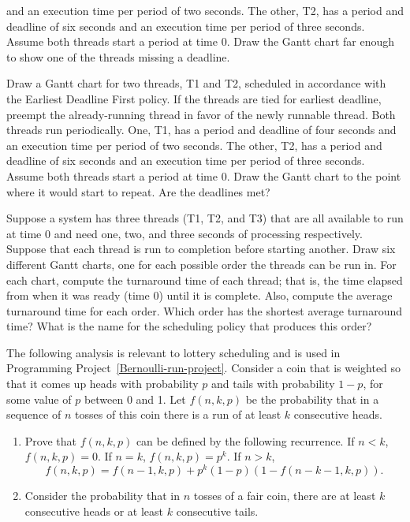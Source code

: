 \begin{chapterEnumerate}
and an execution time per period of two seconds.  The other, T2, has a
period and deadline of six seconds and an execution time per period
of three seconds.  Assume both threads start a period at time 0.  Draw
the Gantt chart far enough to show one of the threads missing a deadline.
\item\label{Gantt-EDF-exercise}
Draw a Gantt chart for two threads, T1 and T2, scheduled in accordance
with the Earliest Deadline First policy.  If the threads are tied for
earliest deadline, preempt the already-running thread in favor of the
newly runnable thread.  Both threads run periodically.  One, T1, has a
period and deadline of four seconds and an execution time per
period of two seconds.  The other, T2, has a period and deadline of
six seconds and an execution time per period of three seconds.
Assume both threads start a period at time 0.  Draw the Gantt chart
to the point where it would start to repeat.  Are the deadlines met?
\item\label{Gantt-SJF-exercise}
Suppose a system has three threads (T1, T2, and T3) that are all
available to run at time 0 and need one,
two, and three seconds of processing respectively.  Suppose that each
thread is run to completion before starting another. Draw six different
Gantt charts, one for each possible order the threads can be run in.
For each chart, compute the turnaround time of each thread; that is,
the time elapsed from when it was ready (time 0) until it is
complete.  Also, compute the average turnaround time for each order.
Which order has the shortest average turnaround time?  What is the
name for the scheduling policy that produces this order?
\item\label{Bernoulli-run-exercise}
The following analysis is relevant to lottery scheduling and is
used in Programming Project~\ref{Bernoulli-run-project}.
Consider a coin that is weighted so that it comes up heads with
probability $p$ and tails with probability $1-p$, for some value of
$p$ between 0 and 1.  Let $f(n,k,p)$ be the probability that in a
sequence of $n$ tosses of this coin there is a run of at least $k$
consecutive heads.
\begin{enumerate}
\item
Prove that $f(n,k,p)$ can be defined by the following recurrence.  If
$n<k$, $f(n,k,p) = 0$.  If $n=k$, $f(n,k,p) = p^k$.  If $n>k$,
\[f(n,k,p) = f(n-1,k,p)+p^k(1-p)(1-f(n-k-1,k,p)).\]
\item
Consider the
probability that in $n$ tosses of a fair coin, there are at least $k$
consecutive heads or at least $k$ consecutive tails.

\end{enumerate}
\end{chapterEnumerate}

